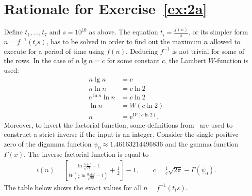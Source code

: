 \documentclass[12pt]{article}
\newcommand{\euler}{\mathrm{e}}
\begin{document}
\appendix

\section{Rationale for Exercise~\ref{ex:2a}}\label{appendix:2a}

Define $t_{1}, \dots, t_{7}$ and $s = 10^{10}$ as above. The equation $t_{i} = \frac{f(n)}{s}$, or its simpler form $n = f^{-1}(t_{i} s)$, has to be solved in order to find out the maximum $n$ allowed to execute for a period of time using $f(n)$. Deducing $f^{-1}$ is not trivial for some of the rows. In the case of $n \lg n = c$ for some constant $c$, the Lambert $W$-function is used:
\begin{align*}
  n \lg n              & = c                    \\
  n \ln n              & = c \ln 2              \\
  \euler^{\ln n} \ln n & = c \ln 2              \\
  \ln n                & = W(c \ln 2)           \\
  n                    & = \euler^{W(c \ln 2)}.
\end{align*}
Moreover, to invert the factorial function, some definitions from~\cite{Cantrell:200110:misc} are used to construct a strict inverse if the input is an integer. Consider the single positive zero of the digamma function $\psi_{0} \approx 1.46163214496836$ and the gamma function $\Gamma(x)$. The inverse factorial function is equal to
\begin{align*}
  \iota(n) = \left[\frac{\ln\frac{n + c}{\sqrt{2 \pi}} - 1}{W(\frac{1}{e}\ln\frac{n + c}{\sqrt{2 \pi}} - 1)} + \frac{1}{2}\right] - 1, \qquad c = \frac{1}{e} \sqrt{2 \pi} - \Gamma(\psi_{0}).
\end{align*}
The table below shows the exact values for all $n = f^{-1}(t_{i} s)$.
\end{document}
